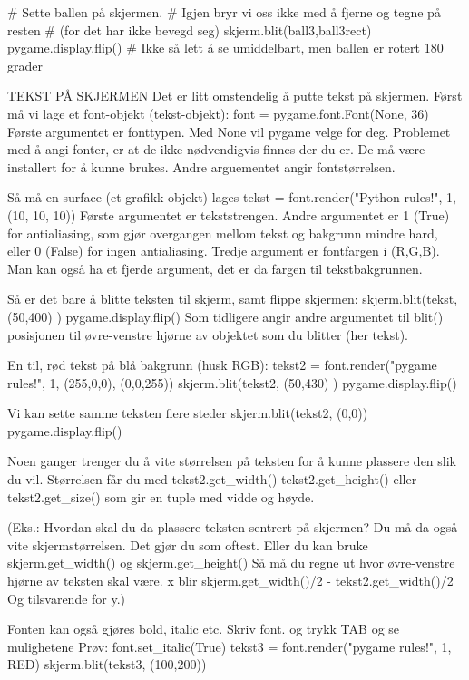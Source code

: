 \documentclass[a4paper,11pt,utf8]{book}
\begin{document}
# Sette ballen på skjermen.
# Igjen bryr vi oss ikke med å fjerne og tegne på resten
# (for det har ikke bevegd seg)
skjerm.blit(ball3,ball3rect)
pygame.display.flip()
# Ikke så lett å se umiddelbart, men ballen er rotert 180 grader



TEKST PÅ SKJERMEN
Det er litt omstendelig å putte tekst på skjermen.
Først må vi lage et font-objekt (tekst-objekt):
font = pygame.font.Font(None, 36)
Første argumentet er fonttypen. Med None vil pygame velge for deg.
Problemet med å angi fonter, er at de ikke nødvendigvis finnes
der du er. De må være installert for å kunne brukes.
Andre arguementet angir fontstørrelsen.

Så må en surface (et grafikk-objekt) lages 
tekst = font.render("Python rules!", 1, (10, 10, 10))
Første argumentet er tekststrengen.
Andre argumentet er 1 (True) for antialiasing, som gjør overgangen
mellom tekst og bakgrunn mindre hard, eller 0 (False) for ingen antialiasing.
Tredje argument er fontfargen i (R,G,B).
Man kan også ha et fjerde argument, det er da fargen til tekstbakgrunnen.

Så er det bare å blitte teksten til skjerm, samt flippe skjermen:
skjerm.blit(tekst, (50,400) ) 
pygame.display.flip()
Som tidligere angir andre argumentet til blit() posisjonen til
øvre-venstre hjørne av objektet som du blitter (her tekst). 


En til, rød tekst på blå bakgrunn (husk RGB): 
tekst2 = font.render("pygame rules!", 1, (255,0,0), (0,0,255))
skjerm.blit(tekst2, (50,430) ) 
pygame.display.flip()

Vi kan sette samme teksten flere steder
skjerm.blit(tekst2, (0,0))
pygame.display.flip()

Noen ganger trenger du å vite størrelsen på teksten for å kunne plassere
den slik du vil.
Størrelsen får du med
tekst2.get_width()
tekst2.get_height()
eller
tekst2.get_size()
som gir en tuple med vidde og høyde. 

(Eks.: Hvordan skal du da plassere teksten sentrert på skjermen?
Du må da også vite skjermstørrelsen. Det gjør du som oftest.
Eller du kan bruke skjerm.get_width() og skjerm.get_height()
Så må du regne ut hvor øvre-venstre hjørne av teksten skal være.
x blir  skjerm.get_width()/2 - tekst2.get_width()/2
Og tilsvarende for y.) 


Fonten kan også gjøres bold, italic etc.
Skriv font. og trykk TAB og se mulighetene
Prøv:
font.set_italic(True)
tekst3 = font.render("pygame rules!", 1, RED)
skjerm.blit(tekst3, (100,200))
\end{document}
